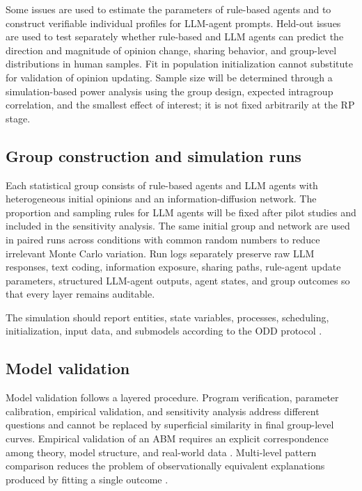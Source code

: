 \documentclass[11pt,a4paper]{article}
\begin{document}
Some issues are used to estimate the parameters of rule-based agents and to construct verifiable individual profiles for LLM-agent prompts. Held-out issues are used to test separately whether rule-based and LLM agents can predict the direction and magnitude of opinion change, sharing behavior, and group-level distributions in human samples. Fit in population initialization cannot substitute for validation of opinion updating. Sample size will be determined through a simulation-based power analysis using the group design, expected intragroup correlation, and the smallest effect of interest; it is not fixed arbitrarily at the RP stage.

\subsection{Group construction and simulation runs}

Each statistical group consists of rule-based agents and LLM agents with heterogeneous initial opinions and an information-diffusion network. The proportion and sampling rules for LLM agents will be fixed after pilot studies and included in the sensitivity analysis. The same initial group and network are used in paired runs across conditions with common random numbers to reduce irrelevant Monte Carlo variation. Run logs separately preserve raw LLM responses, text coding, information exposure, sharing paths, rule-agent update parameters, structured LLM-agent outputs, agent states, and group outcomes so that every layer remains auditable.

The simulation should report entities, state variables, processes, scheduling, initialization, input data, and submodels according to the ODD protocol \cite{grimm2020}.

\subsection{Model validation}

Model validation follows a layered procedure. Program verification, parameter calibration, empirical validation, and sensitivity analysis address different questions and cannot be replaced by superficial similarity in final group-level curves. Empirical validation of an ABM requires an explicit correspondence among theory, model structure, and real-world data \cite{windrum2007}. Multi-level pattern comparison reduces the problem of observationally equivalent explanations produced by fitting a single outcome \cite{grimm2005}.
\end{document}
